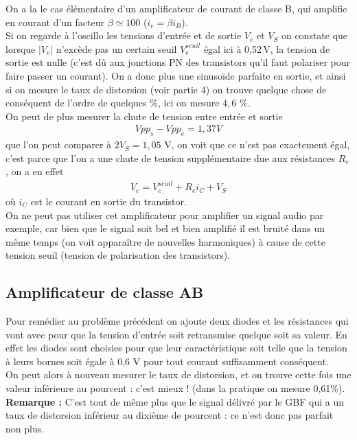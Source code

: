 \documentclass[12pt,prb,aps,epsf]{article}
\begin{document}
On a la le cas élémentaire d'un amplificateur de courant de classe B, qui amplifie en courant d'un facteur $\beta \simeq 100$ ($i_e = \beta i_B$).\\
 
Si on regarde à l'oscillo les tensions d'entrée et de sortie $V_e$ et $V_S$ on constate que lorsque $|V_e|$ n'excède pas un certain seuil $V_e^{seuil}$ égal ici à 0,52\,V, la tension de sortie est nulle (c'est dû aux jonctions PN des transistors qu'il faut polariser pour faire passer un courant). On a donc plus une sinusoïde parfaite en sortie, et ainsi si on mesure le taux de distorsion (voir partie 4) on trouve quelque chose de conséquent de l'ordre de quelques \%, ici on mesure $4,6$ \%.\\

On peut de plus mesurer la chute de tension entre entrée et sortie
\begin{eqnarray}
Vpp_s-Vpp_e = 1,37 V
\end{eqnarray}
que l'on peut comparer à $2V_S = 1,05$ V, on voit que ce n'est pas exactement égal, c'est parce que l'on a une chute de tension supplémentaire due aux résistances $R_e$, on a en effet
\begin{eqnarray}
V_e = V_e^{seuil} + R_e i_C + V_S 
\end{eqnarray}
où $i_C$ est le courant en sortie du transistor.\\

 On ne peut pas utiliser cet amplificateur pour amplifier un signal audio par exemple, car bien que le signal soit bel et bien amplifié il est bruité dans un même temps (on voit apparaître de nouvelles harmoniques) à cause de cette tension seuil (tension de polarisation des transistors).
 
 \subsection{Amplificateur de classe AB}
Pour remédier au problème précédent on ajoute deux diodes et les résistances qui vont avec pour que la tension d'entrée soit retransmise quelque soit sa valeur. En effet les diodes sont choisies pour que leur caractéristique soit telle que la tension à leurs bornes soit égale à 0,6 V pour tout courant suffisamment conséquent.\\ On peut alors à nouveau mesurer le taux de distorsion, et on trouve cette fois une valeur inférieure au pourcent : c'est mieux ! (dans la pratique on mesure 0,61\%).\\
\textbf{Remarque :} C'est tout de même plus que le signal délivré par le GBF qui a un taux de distorsion inférieur au dixième de pourcent : ce n'est donc pas parfait non plus.\\
\end{document}
